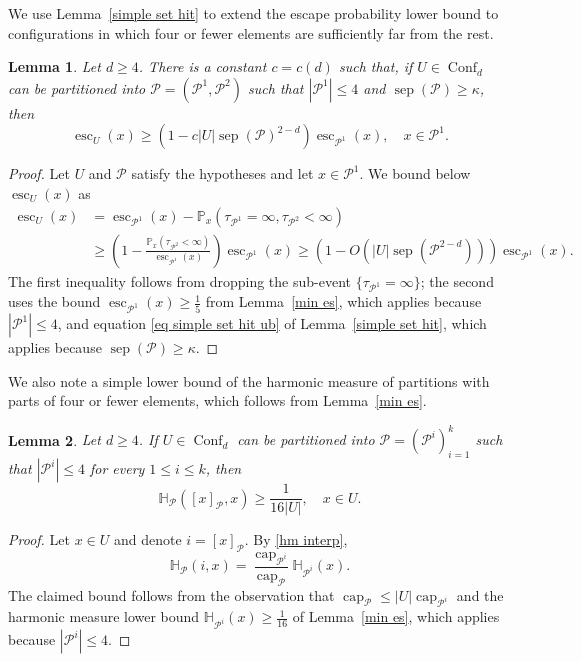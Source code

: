 \documentclass[11pt,reqno]{amsart}
\newtheorem{lemma}{Lemma}[section]
\theoremstyle{definition}
\numberwithin{equation}{section}
\renewcommand{\P}{\mathbb{P}}
\newcommand{\1}{\mathbf{1}}
\renewcommand{\H}{\mathbb{H}}
\DeclareMathOperator{\sep}{sep}
\DeclareMathOperator{\capac}{cap}
\DeclareMathOperator{\Es}{esc}
\DeclareMathOperator{\Conf}{\mathrm{Conf}}
\begin{document}
We use Lemma~\ref{simple set hit} to extend the escape probability lower bound to configurations in which four or fewer elements are sufficiently far from the rest.

\begin{lemma}\label{min hm}
Let $d \geq 4$. There is a constant $c = c(d)$ such that, if $U \in \Conf_d$ can be partitioned into $\mathcal{P} = (\mathcal{P}^1, \mathcal{P}^2)$ such that $|\mathcal{P}^1| \leq 4$ and $\sep (\mathcal{P}) \geq \kappa$, then 
\begin{equation*}
\Es_U (x) \geq \left( 1 - c |U| \sep (\mathcal{P})^{2-d} \right) \Es_{\mathcal{P}^1} (x), \quad x \in \mathcal{P}^1.
\end{equation*}
\end{lemma} 


\begin{proof}
Let $U$ and $\mathcal{P}$ satisfy the hypotheses and let $x \in \mathcal{P}^1$. We bound below $\Es_U (x)$ as
\begin{align*}
\Es_U (x) &= \Es_{\mathcal{P}^1} (x) - \P_x (\tau_{\mathcal{P}^1} = \infty, \tau_{\mathcal{P}^2} < \infty)\\ 
&\geq \left(1 - \frac{\P_x (\tau_{\mathcal{P}^2} < \infty)}{\Es_{\mathcal{P}^1} (x)} \right) \Es_{\mathcal{P}^1} (x) \geq \left(1 - O \left( |U| \sep (\mathcal{P}^{2-d}) \right) \right) \Es_{\mathcal{P}^1} (x).
\end{align*}
The first inequality follows from dropping the sub-event $\{\tau_{\mathcal{P}^1} = \infty\}$; the second uses the bound $\Es_{\mathcal{P}^1} (x) \geq \frac15$ from Lemma~\ref{min es}, which applies because $|\mathcal{P}^1| \leq 4$, and equation \eqref{eq simple set hit ub} of Lemma~\ref{simple set hit}, which applies because $\sep (\mathcal{P}) \geq \kappa$.
\end{proof}

We also note a simple lower bound of the harmonic measure of partitions with parts of four or fewer elements, which follows from Lemma~\ref{min es}.

\begin{lemma}\label{hm small parts}
Let $d \geq 4$. If $U \in \Conf_d$ can be partitioned into $\mathcal{P} = (\mathcal{P}^i)_{i=1}^k$ such that $|\mathcal{P}^i| \leq 4$ for every $1 \leq i \leq k$, then
\[
\H_{\mathcal{P}} ([x]_{\mathcal{P}},x) \geq \frac{1}{16 |U|}, \quad x \in U.
\] 
\end{lemma}

\begin{proof}
Let $x \in U$ and denote $i = [x]_{\mathcal{P}}$. By \eqref{hm interp},
\[
\H_{\mathcal{P}} (i,x) = \frac{\capac_{\mathcal{P}^i}}{\capac_{\mathcal{P}}} \H_{\mathcal{P}^i} (x).
\]
The claimed bound follows from the observation that $\capac_{\mathcal{P}} \leq |U| \capac_{\mathcal{P}^i}$  and the harmonic measure lower bound $\H_{\mathcal{P}^i} (x) \geq \frac{1}{16}$ of Lemma~\ref{min es}, which applies because $|\mathcal{P}^i| \leq 4$.
\end{proof}
\end{document}
